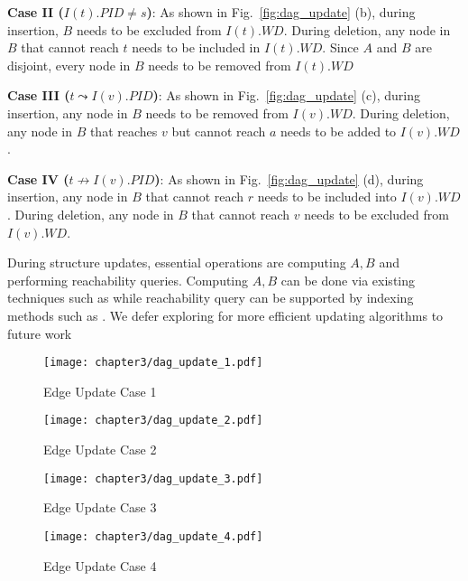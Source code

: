 \textbf{Case II ($I(t).PID \neq s$)}: As shown in Fig.~\ref{fig:dag_update} (b), during insertion, $B$ needs to be excluded from $I(t).WD$. During deletion, any node in $B$ that cannot reach $t$ needs to be included in $I(t).WD$. Since $A$ and $B$ are disjoint, every node in $B$ needs to be removed from $I(t).WD$

\textbf{Case III ($t \leadsto I(v).PID$)}: As shown in Fig.~\ref{fig:dag_update} (c), during insertion, any node in $B$ needs to be removed from $I(v).WD$. During deletion, any node in $B$ that reaches $v$ but cannot reach $a$ needs to be added to $I(v).WD$.

\textbf{Case IV ($t \nrightarrow I(v).PID$)}: As shown in Fig.~\ref{fig:dag_update} (d), during insertion, any node in $B$ that cannot reach $r$ needs to be included into $I(v).WD$. During deletion, any node in $B$ that cannot reach $v$ needs to be excluded from $I(v).WD$.

During structure updates, essential operations are computing $A,B$ and performing reachability queries. Computing $A,B$ can be done via existing techniques such as \cite{bender2005lowest,czumaj2007faster} while reachability query can be supported by indexing methods such as \cite{yildirim2013dagger}. We defer exploring for more efficient updating algorithms to future work 


\begin{figure*}[t]
\centering
\begin{subfigure}{0.20\linewidth}
\centering
  \texttt{[image: chapter3/dag\_update\_1.pdf]}
  \caption{Edge Update Case 1}
\end{subfigure}%
\begin{subfigure}{0.20\linewidth}
\centering
  \texttt{[image: chapter3/dag\_update\_2.pdf]}
  \caption{Edge Update Case 2}
\end{subfigure}
\begin{subfigure}{0.19\linewidth}
\centering
  \texttt{[image: chapter3/dag\_update\_3.pdf]}
  \caption{Edge Update Case 3}
\end{subfigure}
\begin{subfigure}{0.20\linewidth}
\centering
  \texttt{[image: chapter3/dag\_update\_4.pdf]}
  \caption{Edge Update Case 4}
\end{subfigure}
\caption{Updates on \emph{I-Index}. Cloud shape indicate the nodes in the subgraph between the endpoint nodes. The dashed circle indicate the affected range of updates. The bold arrow indicates the $PID$ field \emph{I-Index}}
\label{fig:dag_update}
\end{figure*}

